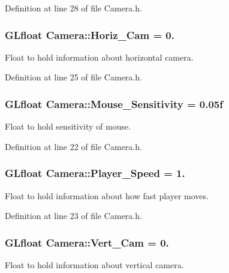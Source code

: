 Definition at line 28 of file Camera.\+h.

\hypertarget{class_camera_a7b52b1b9a336c038442c6442d1fcbf92}{}
\subsubsection[{Horiz\+\_\+\+Cam}]{\setlength{\rightskip}{0pt plus 5cm}G\+Lfloat Camera\+::\+Horiz\+\_\+\+Cam = 0.}\label{class_camera_a7b52b1b9a336c038442c6442d1fcbf92}
Float to hold information about horizontal camera. 

Definition at line 25 of file Camera.\+h.

\hypertarget{class_camera_ada530cf7b97b15431c729ddc3435d702}{}
\subsubsection[{Mouse\+\_\+\+Sensitivity}]{\setlength{\rightskip}{0pt plus 5cm}G\+Lfloat Camera\+::\+Mouse\+\_\+\+Sensitivity = 0.\+05f}\label{class_camera_ada530cf7b97b15431c729ddc3435d702}
Float to hold sensitivity of mouse. 

Definition at line 22 of file Camera.\+h.

\hypertarget{class_camera_ab20174a89f86b685216dfe825e9ce95d}{}
\subsubsection[{Player\+\_\+\+Speed}]{\setlength{\rightskip}{0pt plus 5cm}G\+Lfloat Camera\+::\+Player\+\_\+\+Speed = 1.}\label{class_camera_ab20174a89f86b685216dfe825e9ce95d}
Float to hold information about how fast player moves. 

Definition at line 23 of file Camera.\+h.

\hypertarget{class_camera_a04b5fdf888820779329b982e3f7cc635}{}
\subsubsection[{Vert\+\_\+\+Cam}]{\setlength{\rightskip}{0pt plus 5cm}G\+Lfloat Camera\+::\+Vert\+\_\+\+Cam = 0.}\label{class_camera_a04b5fdf888820779329b982e3f7cc635}
Float to hold information about vertical camera. 

